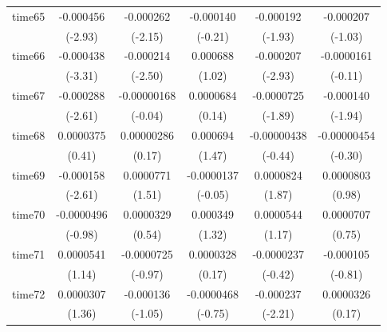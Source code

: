 \begin{table}[htbp]
\begin{tabular}{l*{5}{c}}
time65      &   -0.000456\sym{**} &   -0.000262\sym{*}  &   -0.000140         &   -0.000192         &   -0.000207         \\
            &     (-2.93)         &     (-2.15)         &     (-0.21)         &     (-1.93)         &     (-1.03)         \\
time66      &   -0.000438\sym{***}&   -0.000214\sym{*}  &    0.000688         &   -0.000207\sym{**} &  -0.0000161         \\
            &     (-3.31)         &     (-2.50)         &      (1.02)         &     (-2.93)         &     (-0.11)         \\
time67      &   -0.000288\sym{**} & -0.00000168         &   0.0000684         &  -0.0000725         &   -0.000140         \\
            &     (-2.61)         &     (-0.04)         &      (0.14)         &     (-1.89)         &     (-1.94)         \\
time68      &   0.0000375         &  0.00000286         &    0.000694         & -0.00000438         & -0.00000454         \\
            &      (0.41)         &      (0.17)         &      (1.47)         &     (-0.44)         &     (-0.30)         \\
time69      &   -0.000158\sym{**} &   0.0000771         &  -0.0000137         &   0.0000824         &   0.0000803         \\
            &     (-2.61)         &      (1.51)         &     (-0.05)         &      (1.87)         &      (0.98)         \\
time70      &  -0.0000496         &   0.0000329         &    0.000349         &   0.0000544         &   0.0000707         \\
            &     (-0.98)         &      (0.54)         &      (1.32)         &      (1.17)         &      (0.75)         \\
time71      &   0.0000541         &  -0.0000725         &   0.0000328         &  -0.0000237         &   -0.000105         \\
            &      (1.14)         &     (-0.97)         &      (0.17)         &     (-0.42)         &     (-0.81)         \\
time72      &   0.0000307         &   -0.000136         &  -0.0000468         &   -0.000237\sym{*}  &   0.0000326         \\
            &      (1.36)         &     (-1.05)         &     (-0.75)         &     (-2.21)         &      (0.17)         \\

\end{tabular}
\end{table}
